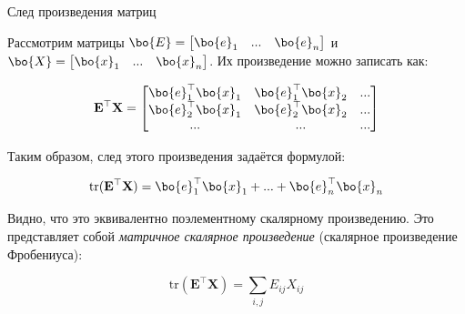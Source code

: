 \documentclass{beamer}
\begin{document}
\begin{frame}{След произведения матриц}
	\begin{flushleft}
		
		Рассмотрим матрицы $\bo{E} = \begin{bmatrix}
			\bo{e}_1 & ... & \bo{e}_n
		\end{bmatrix}$ и 
		$\bo{X} = \begin{bmatrix}
			\bo{x}_1 & ... & \bo{x}_n
		\end{bmatrix}$. Их произведение можно записать как:
		
		\begin{equation}
			\mathbf{E}^\top \mathbf{X} = 
			\begin{bmatrix}
				\bo{e}_1^\top \bo{x}_1 & \bo{e}_1^\top \bo{x}_2 & ... \\
				\bo{e}_2^\top \bo{x}_1 & \bo{e}_2^\top \bo{x}_2 & ... \\
				... & ... & ... 
			\end{bmatrix}
		\end{equation}
		
		Таким образом, след этого произведения задаётся формулой:
		
		\begin{equation}
			\text{tr}(\mathbf{E}^\top\mathbf{X}) =  \bo{e}_1^\top \bo{x}_1 + ... + \bo{e}_n^\top \bo{x}_n
		\end{equation}
		
		Видно, что это эквивалентно поэлементному скалярному произведению. Это представляет собой \emph{матричное скалярное произведение} (скалярное произведение Фробениуса):
		
		\begin{equation}
			\text{tr}(\mathbf{E}^\top\mathbf{X}) =  \sum_{i,j} E_{ij} X_{ij}
		\end{equation}
		
	\end{flushleft}
\end{frame}
\end{document}
